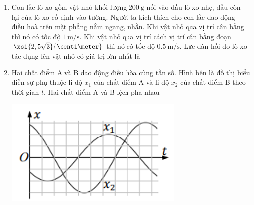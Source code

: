 \begin{enumerate}[label=\bfseries Câu \arabic*:]
{}

\item Con lắc lò xo gồm vật nhỏ khối lượng $\SI{200}{\gram}$ nối vào đầu lò xo nhẹ, đầu còn lại của lò xo cố định vào tường. Người ta kích thích cho con lắc dao động điều hoà trên mặt phẳng nằm ngang, nhẵn. Khi vật nhỏ qua vị trí cân bằng thì nó có tốc độ $\SI{1}{\meter/\second}$. Khi vật nhỏ qua vị trí cách vị trí cân bằng đoạn $\xsi{2,5\sqrt{3}}{\centi\meter}$ thì nó có tốc độ $\SI{0.5}{\meter/\second}$. Lực đàn hồi do lò xo tác dụng lên vật nhỏ có giá trị lớn nhất là

\item Hai chất điểm A và B dao động điều hòa cùng tần số. Hình bên là đồ thị biểu diễn sự phụ thuộc li độ $x_1$ của chất điểm A và li độ $x_2$ của chất điểm B theo thời gian $t$. Hai chất điểm A và B lệch pha nhau
\begin{center}
	\includegraphics[width=0.35\linewidth]{../figs/D11-3-6}
\end{center}


\end{enumerate}
